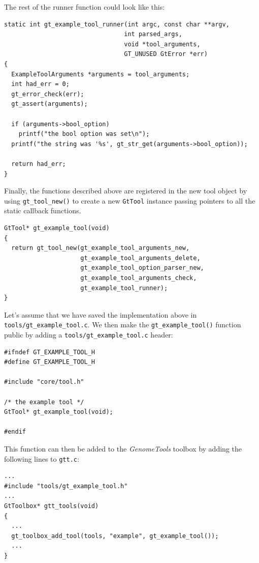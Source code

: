 \documentclass[11pt,final]{article}
\newcommand{\keyword}[1]{\lstinline{#1}}
\newcommand{\Gt}[0]{\emph{GenomeTools}\xspace}
\begin{document}
The rest of the runner function could look like this:

\begin{lstlisting}
static int gt_example_tool_runner(int argc, const char **argv,
                                 int parsed_args,
                                 void *tool_arguments,
                                 GT_UNUSED GtError *err)
{
  ExampleToolArguments *arguments = tool_arguments;
  int had_err = 0;
  gt_error_check(err);
  gt_assert(arguments);

  if (arguments->bool_option)
    printf("the bool option was set\n");
  printf("the string was '%s', gt_str_get(arguments->bool_option));

  return had_err;
}
\end{lstlisting}

Finally, the functions described above are registered in the new tool object
by using \keyword{gt_tool_new()} to create a new \keyword{GtTool} instance
passing pointers to all the static callback functions.

\begin{lstlisting}
GtTool* gt_example_tool(void)
{
  return gt_tool_new(gt_example_tool_arguments_new,
                     gt_example_tool_arguments_delete,
                     gt_example_tool_option_parser_new,
                     gt_example_tool_arguments_check,
                     gt_example_tool_runner);
}
\end{lstlisting}

Let's assume that we have saved the implementation above in
\keyword{tools/gt_example_tool.c}. We then make the \keyword{gt_example_tool()}
function public by adding a \keyword{tools/gt_example_tool.c} header:

\begin{lstlisting}
#ifndef GT_EXAMPLE_TOOL_H
#define GT_EXAMPLE_TOOL_H

#include "core/tool.h"

/* the example tool */
GtTool* gt_example_tool(void);

#endif
\end{lstlisting}

This function can then be added to the \Gt toolbox by adding the following lines
to \keyword{gtt.c}:

\begin{lstlisting}
...
#include "tools/gt_example_tool.h"
...
GtToolbox* gtt_tools(void)
{
  ...
  gt_toolbox_add_tool(tools, "example", gt_example_tool());
  ...
}
\end{lstlisting}
\end{document}
